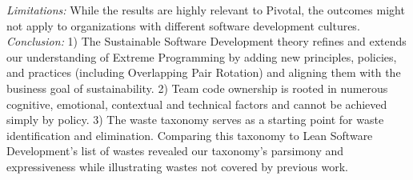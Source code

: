 \documentclass[oneside,letterpaper]{memoir}
\begin{document}
\textit{Limitations:} While the results are highly relevant to Pivotal, the outcomes might not apply to organizations with different software development cultures.
\textit{Conclusion:} 
1) The Sustainable Software Development theory refines and extends our understanding of Extreme Programming by adding new principles, policies, and practices (including Overlapping Pair Rotation) and aligning them with the business goal of sustainability. 2) Team code ownership is rooted in numerous cognitive, emotional, contextual and technical factors and cannot be achieved simply by policy. 3) The waste taxonomy serves as a starting point for waste identification and elimination. Comparing this taxonomy to Lean Software Development's list of wastes revealed our taxonomy's parsimony and expressiveness while illustrating wastes not covered by previous work. 






\end{document}
